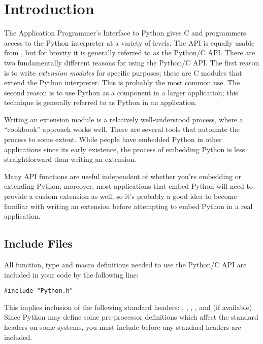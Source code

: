 \chapter{Introduction \label{intro}}


The Application Programmer's Interface to Python gives C and
\Cpp{} programmers access to the Python interpreter at a variety of
levels.  The API is equally usable from \Cpp, but for brevity it is
generally referred to as the Python/C API.  There are two
fundamentally different reasons for using the Python/C API.  The first
reason is to write \emph{extension modules} for specific purposes;
these are C modules that extend the Python interpreter.  This is
probably the most common use.  The second reason is to use Python as a
component in a larger application; this technique is generally
referred to as  Python in an application.

Writing an extension module is a relatively well-understood process, 
where a ``cookbook'' approach works well.  There are several tools 
that automate the process to some extent.  While people have embedded 
Python in other applications since its early existence, the process of 
embedding Python is less straightforward than writing an extension.  

Many API functions are useful independent of whether you're embedding 
or extending Python; moreover, most applications that embed Python 
will need to provide a custom extension as well, so it's probably a 
good idea to become familiar with writing an extension before 
attempting to embed Python in a real application.


\section{Include Files \label{includes}}

All function, type and macro definitions needed to use the Python/C
API are included in your code by the following line:

\begin{verbatim}
#include "Python.h"
\end{verbatim}

This implies inclusion of the following standard headers:
, , ,
, and  (if available).
Since Python may define some pre-processor definitions which affect
the standard headers on some systems, you must include 
before any standard headers are included.

